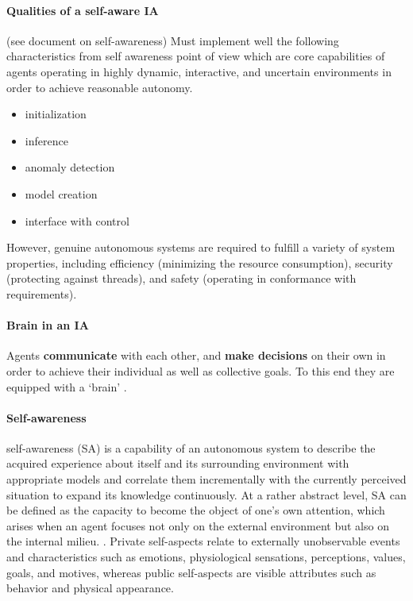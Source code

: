 \documentclass{article}
\begin{document}
	 \paragraph{Qualities of a self-aware IA}
	 (see document on self-awareness)
	 Must implement well the following characteristics from self awareness point of view which are core capabilities of agents operating in highly dynamic, interactive, and uncertain environments
	 in order to achieve reasonable autonomy.
	 \begin{itemize}
	 	\item initialization
	 	\item inference
	 	\item anomaly detection
	 	\item model creation
	 	\item interface with control
	 \end{itemize}
	  However, genuine autonomous systems are required to fulfill a variety of system properties, including efficiency (minimizing the resource consumption), security (protecting against threads), and safety
	 (operating in conformance with requirements).
	 
	 \paragraph{Brain in an IA} Agents \textbf{communicate} with each other, and \textbf{make decisions} on their own in order to achieve their individual as well as collective goals. To this end they are equipped with a  ‘brain’ \citep{ciprich-2008-the-architecture-of-an-intelligent-agent-in-mas}.
	 
	 \paragraph{Self-awareness} self-awareness (SA) is a capability of an autonomous system to describe the acquired experience about itself and its surrounding environment with appropriate models and correlate them incrementally with the currently perceived situation to expand its knowledge continuously. At a rather abstract level, SA can be defined as the capacity to become the object of one’s own attention, which arises when an agent focuses not only on the external environment but also on the internal milieu. \cite{regazzoni-2020-multi-sensorial-generative-and-descriptive-self-awareness-models-for-autonomous-systems}. Private self-aspects relate to externally unobservable events and characteristics such as emotions, physiological sensations, perceptions, values, goals, and motives, whereas public self-aspects are visible attributes such as behavior and physical appearance.
	 
\end{document}
